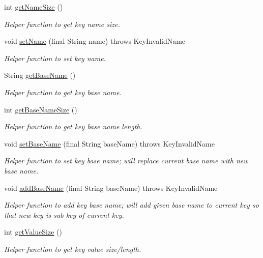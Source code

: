 \begin{DoxyCompactItemize}
int \hyperlink{classorg_1_1libelektra_1_1Key_aa6477bb5eb12f739858f285650816cc6}{get\+Name\+Size} ()
\begin{DoxyCompactList}\small\item\em Helper function to get key name size. \end{DoxyCompactList}\item 
void \hyperlink{classorg_1_1libelektra_1_1Key_abd5602765701a10b6a10887c09810cf5}{set\+Name} (final String name)  throws Key\+Invalid\+Name 	
\begin{DoxyCompactList}\small\item\em Helper function to set key name. \end{DoxyCompactList}\item 
String \hyperlink{classorg_1_1libelektra_1_1Key_a32c556682f808bbc0a4b676879f6b86f}{get\+Base\+Name} ()
\begin{DoxyCompactList}\small\item\em Helper function to get key base name. \end{DoxyCompactList}\item 
int \hyperlink{classorg_1_1libelektra_1_1Key_a24bd83bcae08b956150d8ae3dafe738e}{get\+Base\+Name\+Size} ()
\begin{DoxyCompactList}\small\item\em Helper function to get key base name length. \end{DoxyCompactList}\item 
void \hyperlink{classorg_1_1libelektra_1_1Key_a5226472bedc6a02dee826ee3facdb25f}{set\+Base\+Name} (final String base\+Name)  throws Key\+Invalid\+Name 	
\begin{DoxyCompactList}\small\item\em Helper function to set key base name; will replace current base name with new base name. \end{DoxyCompactList}\item 
void \hyperlink{classorg_1_1libelektra_1_1Key_a07a939d44265c7b017104f3f37e9ca16}{add\+Base\+Name} (final String base\+Name)  throws Key\+Invalid\+Name 	
\begin{DoxyCompactList}\small\item\em Helper function to add key base name; will add given base name to current key so that new key is sub key of current key. \end{DoxyCompactList}\item 
int \hyperlink{classorg_1_1libelektra_1_1Key_aeb1c3e899a17778c8511a08ee0472e43}{get\+Value\+Size} ()
\begin{DoxyCompactList}\small\item\em Helper function to get key value size/length. \end{DoxyCompactList}\item 

\end{DoxyCompactItemize}
